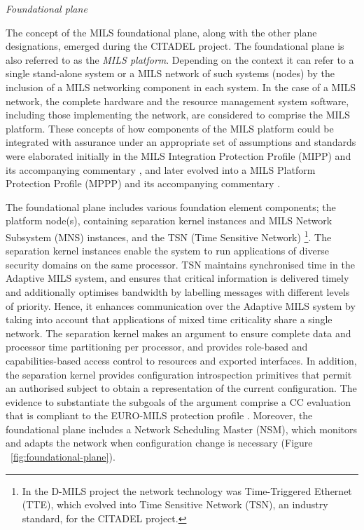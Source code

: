 \documentclass[12pt,twoside,a4paper]{article}
\begin{document}
\clearpage
\emph{Foundational plane}

The concept of the MILS foundational plane,
along with the other plane designations,
emerged during the CITADEL project.
The foundational plane is also referred to as the \emph{MILS platform}.
Depending on the context it can refer to a single stand-alone system or a MILS network of such systems (nodes) by the inclusion of a MILS networking component in each system.
In the case of a MILS network, the complete hardware and the resource management system software, including those implementing the network, are considered to comprise the MILS platform.
These concepts of how components of the MILS platform could be integrated with assurance under an appropriate set of assumptions and standards were elaborated initially in the MILS Integration Protection Profile (MIPP) \cite {MIPP} and its accompanying commentary
\cite{MIPP-commentary}, and later evolved into a MILS Platform Protection Profile (MPPP) \cite {MPPP} and its accompanying commentary \cite{MPPP-commentary}.

The foundational plane includes various foundation element components; the platform node(s), containing separation kernel instances and MILS Network Subsystem (MNS) instances, and the TSN (Time Sensitive Network) \cite{TSN}\footnote{In the D-MILS project the network technology was Time-Triggered Ethernet (TTE), which evolved into Time Sensitive Network (TSN), an industry standard, for the CITADEL project.}. The separation kernel instances enable the system to run applications of diverse security domains on the same processor. TSN maintains synchronised time in the Adaptive MILS system, and ensures that critical information is delivered timely and additionally optimises bandwidth by labelling messages with different levels of priority. Hence, it enhances communication over the Adaptive MILS system by taking into account that applications of mixed time criticality share a single network. 
The separation kernel makes an argument to ensure complete data and processor time partitioning per processor, and provides role-based and capabilities-based access control to resources and exported interfaces. In addition, the separation kernel provides configuration introspection primitives that permit an authorised subject to obtain a representation of the current configuration. The evidence to substantiate the subgoals of the argument comprise a CC evaluation that is compliant to the EURO-MILS protection profile \cite{EMPP}. 
Moreover, the foundational plane includes a Network Scheduling Master (NSM), which monitors and adapts the network when configuration change is necessary (Figure ~\ref{fig:foundational-plane}).
\end{document}
